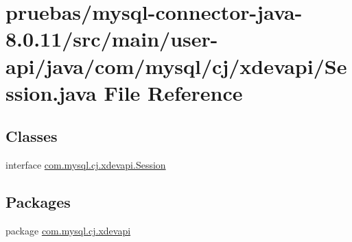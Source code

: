 \hypertarget{user-api_2java_2com_2mysql_2cj_2xdevapi_2_session_8java}{}\section{pruebas/mysql-\/connector-\/java-\/8.0.11/src/main/user-\/api/java/com/mysql/cj/xdevapi/\+Session.java File Reference}
\label{user-api_2java_2com_2mysql_2cj_2xdevapi_2_session_8java}
\subsection*{Classes}
\begin{DoxyCompactItemize}
\item 
interface \mbox{\hyperlink{interfacecom_1_1mysql_1_1cj_1_1xdevapi_1_1_session}{com.\+mysql.\+cj.\+xdevapi.\+Session}}
\end{DoxyCompactItemize}
\subsection*{Packages}
\begin{DoxyCompactItemize}
\item 
package \mbox{\hyperlink{namespacecom_1_1mysql_1_1cj_1_1xdevapi}{com.\+mysql.\+cj.\+xdevapi}}
\end{DoxyCompactItemize}

